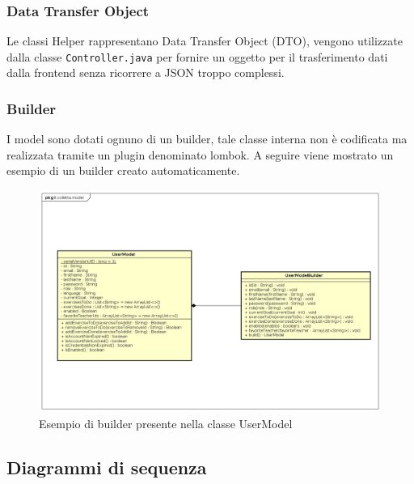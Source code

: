 \subsubsection{Data Transfer Object}
Le classi Helper rappresentano Data Transfer Object (DTO), vengono utilizzate dalla classe \texttt{Controller.java} per fornire un oggetto per il trasferimento dati dalla frontend senza ricorrere a JSON troppo complessi.

\subsubsection{Builder}
I model sono dotati ognuno di un builder, tale classe interna non è codificata ma realizzata tramite un plugin denominato lombok. A seguire viene mostrato un esempio di un builder creato automaticamente.
\begin{figure}[H]
\centering
\includegraphics[width=15cm]{img/builder.png}
\caption{Esempio di builder presente nella classe UserModel}
\end{figure}


\newpage
\subsection{Diagrammi di sequenza}



